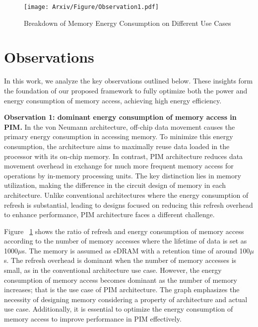 \begin{figure}[t]
\centering
\texttt{[image: Arxiv/Figure/Observation1.pdf]}
\caption{Breakdown of Memory Energy Consumption on Different Use Cases}
\label{figure3-1}
\end{figure}

\section{Observations}
\label{observations}


In this work, we analyze the key observations outlined below. These insights form the foundation of our proposed \sysname framework to fully optimize both the power and energy consumption of memory access, achieving high energy efficiency.

\textbf{Observation 1: dominant energy consumption of memory access in PIM.} In the von Neumann architecture, off-chip data movement causes the primary energy consumption in accessing memory. To minimize this energy consumption, the architecture aims to maximally reuse data loaded in the processor with its on-chip memory. In contrast, PIM architecture reduces data movement overhead in exchange for much more frequent memory access for operations by in-memory processing units. The key distinction lies in memory utilization, making the difference in the circuit design of memory in each architecture. Unlike conventional architectures where the energy consumption of refresh is substantial, leading to designs focused on reducing this refresh overhead to enhance performance, PIM architecture faces a different challenge.

Figure ~\ref{figure3-1} shows the ratio of refresh and energy consumption of memory access according to the number of memory accesses where the lifetime of data is set as 1000$\mu$s. The memory is assumed as eDRAM with a retention time of around 100$\mu$s. The refresh overhead is dominant when the number of memory accesses is small, as in the conventional architecture use case. However, the energy consumption of memory access becomes dominant as the number of memory increases; that is the use case of PIM architecture. The graph emphasizes the necessity of designing memory considering a property of architecture and actual use case. Additionally, it is essential to optimize the energy consumption of memory access to improve performance in PIM effectively.



